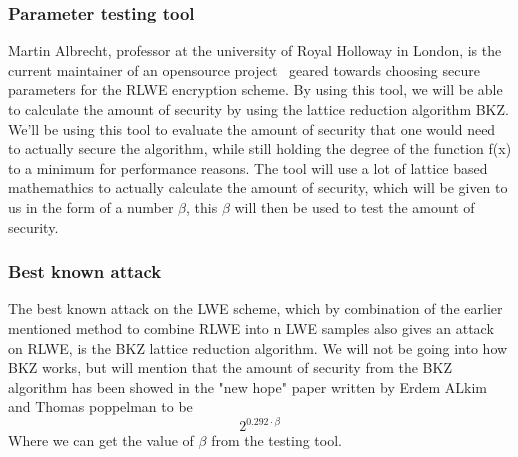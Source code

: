 \documentclass[../main.tex]{subfiles}
\begin{document}
    \subsubsection{Parameter testing tool}
        Martin Albrecht, professor at the university of Royal Holloway in London, is the current maintainer of an
		opensource project~\cite{estimations-tool} geared towards choosing secure parameters for the RLWE encryption scheme.
		By using this tool, we will be able to calculate the amount of security by using the lattice reduction algorithm BKZ.
		We'll be using this tool to evaluate the amount of security that one would need to actually secure the algorithm,
		while still holding the degree of the function f(x) to a minimum for performance reasons.
		The tool will use a lot of lattice based mathemathics to actually calculate the amount of security, which will be given
		to us in the form of a number $\beta$, this $\beta$ will then be used to test the amount of security.

    \subsubsection{Best known attack}
		The best known attack on the LWE scheme, which by combination of the earlier mentioned method to combine RLWE
		into n LWE samples also gives an attack on RLWE, is the BKZ lattice reduction algorithm.
		We will not be going into how BKZ works, but will mention that the amount of security from the BKZ algorithm
		has been showed in the "new hope" paper \cite{usenix16} written by Erdem ALkim and Thomas poppelman to be
		\[ 2^{0.292 \cdot \beta} \]
		Where we can get the value of $\beta$ from the testing tool.
\end{document}
